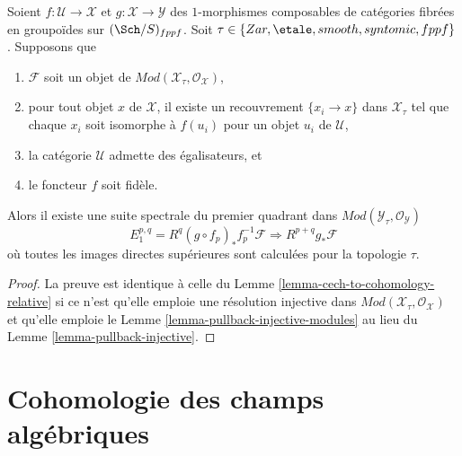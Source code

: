 \begin{lemma}
\label{lemma-cech-to-cohomology-relative-modules}
Soient $f : \mathcal{U} \to \mathcal{X}$ et
$g : \mathcal{X} \to \mathcal{Y}$
des $1$-morphismes composables de catégories fibrées
en groupoïdes sur $(\Sch/S)_{fppf}$. Soit
$\tau \in \{Zar, \etale, smooth, syntomic, \linebreak[0] fppf\}$.
Supposons que
\begin{enumerate}
\item $\mathcal{F}$ soit un objet de
$\textit{Mod}(\mathcal{X}_\tau, \mathcal{O}_\mathcal{X})$,
\item pour tout objet $x$ de $\mathcal{X}$, il existe un recouvrement
$\{x_i \to x\}$ dans $\mathcal{X}_\tau$ tel que chaque $x_i$ soit isomorphe
à $f(u_i)$ pour un objet $u_i$ de $\mathcal{U}$,
\item la catégorie $\mathcal{U}$ admette des égalisateurs, et
\item le foncteur $f$ soit fidèle.
\end{enumerate}
Alors il existe une suite spectrale du premier quadrant dans
$\textit{Mod}(\mathcal{Y}_\tau, \mathcal{O}_\mathcal{Y})$
$$
E_1^{p, q} = R^q(g \circ f_p)_*f_p^{-1}\mathcal{F}
\Rightarrow
R^{p + q}g_*\mathcal{F}
$$
où toutes les images directes supérieures sont calculées pour la topologie $\tau$.
\end{lemma}

\begin{proof}
La preuve est identique à celle du
Lemme \ref{lemma-cech-to-cohomology-relative}
si ce n'est qu'elle emploie une résolution injective dans
$\textit{Mod}(\mathcal{X}_\tau, \mathcal{O}_\mathcal{X})$
et qu'elle emploie le
Lemme \ref{lemma-pullback-injective-modules}
au lieu du
Lemme \ref{lemma-pullback-injective}.
\end{proof}






\section{Cohomologie des champs algébriques}
\label{section-cohomology}

